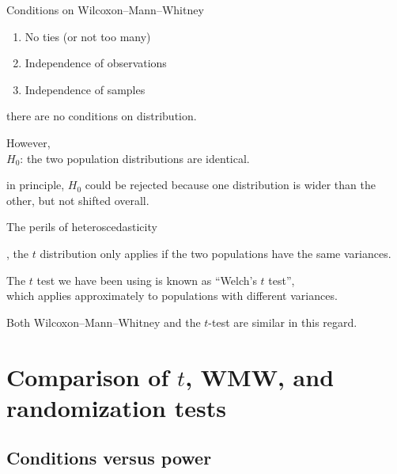 \begin{frame}{Conditions on Wilcoxon--Mann--Whitney}

  \begin{enumerate}
    \item No ties (or not too many)
    \item Independence of observations
    \item Independence of samples
  \end{enumerate}

    \vspace{2em}

     there are no conditions on distribution.

    \vspace{2em}
   \alert{However,}\\
    $H_0$: the two population distributions are identical.


    \vspace{2em}

     in principle, $H_0$ could be rejected because one distribution is wider than the other, but not shifted overall.

\end{frame}


\begin{frame}{The perils of heteroscedasticity}

  , the $t$ distribution only applies 
  if the two populations have the \alert{same variances}.

    \vspace{2em}

  The $t$ test we have been using is known as ``Welch's $t$ test'',\\
  which applies approximately to populations with different variances.

    \vspace{2em}

    Both Wilcoxon--Mann--Whitney and the $t$-test are similar in this regard.

\end{frame}


\section{Comparison of $t$, WMW, and randomization tests}

\subsection{Conditions versus power}

